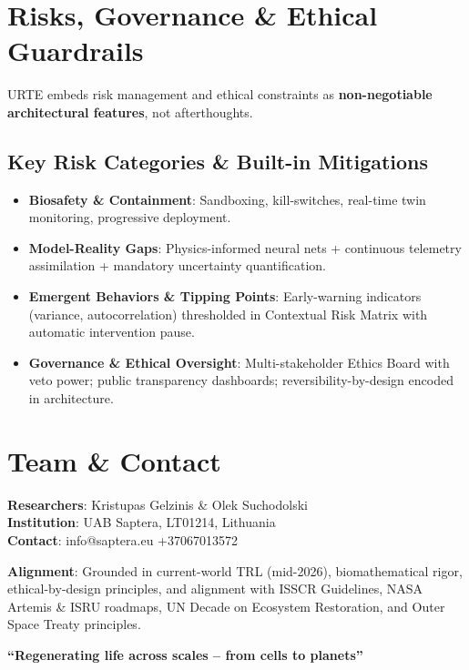 \documentclass[11pt,a4paper]{article}
\begin{document}
\section{Risks, Governance \& Ethical Guardrails}

URTE embeds risk management and ethical constraints as \textbf{non-negotiable architectural features}, not afterthoughts.

\subsection{Key Risk Categories \& Built-in Mitigations}
\begin{itemize}
    \item \textbf{Biosafety \& Containment}: Sandboxing, kill-switches, real-time twin monitoring, progressive deployment.
    \item \textbf{Model-Reality Gaps}: Physics-informed neural nets + continuous telemetry assimilation + mandatory uncertainty quantification.
    \item \textbf{Emergent Behaviors \& Tipping Points}: Early-warning indicators (variance, autocorrelation) thresholded in Contextual Risk Matrix with automatic intervention pause.
    \item \textbf{Governance \& Ethical Oversight}: Multi-stakeholder Ethics Board with veto power; public transparency dashboards; reversibility-by-design encoded in architecture.
\end{itemize}

\section{Team \& Contact}

\textbf{Researchers}: Kristupas Gelzinis \& Olek Suchodolski \\
\textbf{Institution}: UAB Saptera, LT01214, Lithuania \\
\textbf{Contact}: info@saptera.eu \quad +37067013572

\textbf{Alignment}: Grounded in current-world TRL (mid-2026), biomathematical rigor, ethical-by-design principles, and alignment with ISSCR Guidelines, NASA Artemis \& ISRU roadmaps, UN Decade on Ecosystem Restoration, and Outer Space Treaty principles.

\vspace{1cm}
\begin{center}
\textbf{``Regenerating life across scales -- from cells to planets''}
\end{center}
\end{document}
